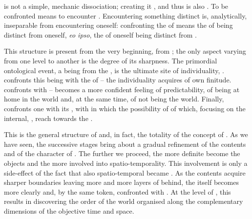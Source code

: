 \pa {} is not a simple, mechanic dissociation; creating
 it , and thus is also .  To be
confronted means to encounter .  Encountering something
distinct is, analytically, inseparable from encountering oneself: confronting
the  of  means the  of  being
distinct from oneself, {\em eo ipso}, the  of oneself being
distinct from .

This structure is present from the very beginning, from ; 
%
the only aspect varying from one level to another is the degree of its
sharpness. The primordial ontological event,  a being from the
, is the ultimate site of individuality, .
 confronts this being with the  of 
-- the individuality acquires  of own finitude.
 confronts  with  --
 becomes a more confident feeling of predictability, of being
at home in the world and, at the same time, of not being the world. Finally,
 confronts one with its , with  in
which   the possibility of 
of  which, focusing on the internal, ,
reach towards the  .

This is the general structure of  and, in fact, the totality
of the concept of . 
% 
%
As we have seen, the successive stages bring about a gradual refinement of the
 contents and of the character of . The further
we proceed, the more definite become the objects and the more involved into
spatio-temporality. This involvement is only a side-effect of the fact that also
spatio-temporal  became .  As the
 contents acquire sharper boundaries leaving more and more
layers of  behind, the  itself becomes more
clearly  and, by the same token, confronted with
 .  At the level of ,
this results in discovering the  order of the world organised
along the complementary dimensions of the objective time and space.

